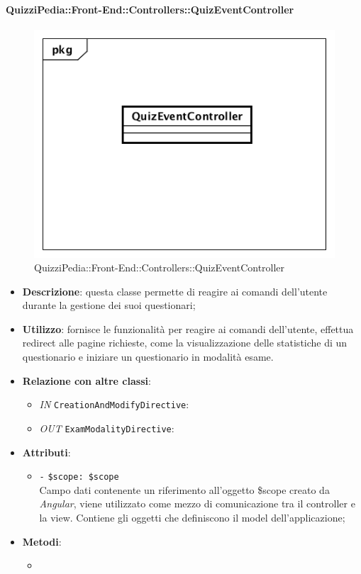 \paragraph{QuizziPedia::Front-End::Controllers::QuizEventController}
\begin{figure}
	\centering
	\includegraphics[scale=0.45]{UML/Classi/Front-End/QuizziPedia_Front-end_Controller_QuizEventController.png}
	\caption{QuizziPedia::Front-End::Controllers::QuizEventController}
\end{figure}
\begin{itemize}
	\item \textbf{Descrizione}: questa classe permette di reagire ai comandi dell'utente durante la gestione dei suoi questionari;
	\item \textbf{Utilizzo}: fornisce le funzionalità per reagire ai comandi dell'utente, effettua redirect alle pagine richieste, come la visualizzazione delle statistiche di un questionario e iniziare un questionario in modalità esame.
	\item \textbf{Relazione con altre classi}:
	\begin{itemize}
		\item \textit{IN} \texttt{CreationAndModifyDirective}:  
		\item \textit{OUT} \texttt{ExamModalityDirective}:
	\end{itemize}
	\item \textbf{Attributi}:
	\begin{itemize}
		\item \texttt{-} \texttt{\$scope: \$scope} \\
		Campo dati contenente un riferimento all’oggetto \$scope creato da \textit{Angular}, viene utilizzato come mezzo di comunicazione tra il controller e la view. Contiene gli oggetti che definiscono il model dell’applicazione;
	\end{itemize}
	\item \textbf{Metodi}:
	\begin{itemize}
		\item 
	\end{itemize}
\end{itemize}